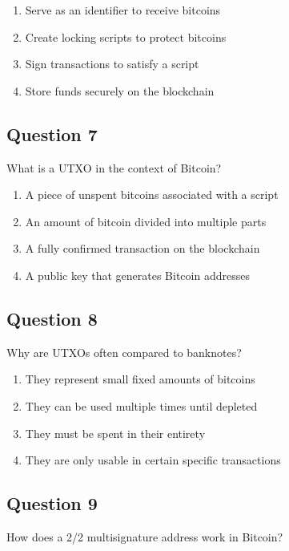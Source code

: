 \documentclass[12pt,a4paper]{article}
\begin{document}
\begin{enumerate}[label=\Alph*., leftmargin=*]
\item Serve as an identifier to receive bitcoins
\item Create locking scripts to protect bitcoins
\item Sign transactions to satisfy a script
\item Store funds securely on the blockchain
\end{enumerate}

\bigskip


\subsection*{Question 7}
What is a UTXO in the context of Bitcoin?

\begin{enumerate}[label=\Alph*., leftmargin=*]
\item A piece of unspent bitcoins associated with a script
\item An amount of bitcoin divided into multiple parts
\item A fully confirmed transaction on the blockchain
\item A public key that generates Bitcoin addresses
\end{enumerate}

\bigskip


\subsection*{Question 8}
Why are UTXOs often compared to banknotes?

\begin{enumerate}[label=\Alph*., leftmargin=*]
\item They represent small fixed amounts of bitcoins
\item They can be used multiple times until depleted
\item They must be spent in their entirety
\item They are only usable in certain specific transactions
\end{enumerate}

\bigskip


\subsection*{Question 9}
How does a 2/2 multisignature address work in Bitcoin?
\end{document}
